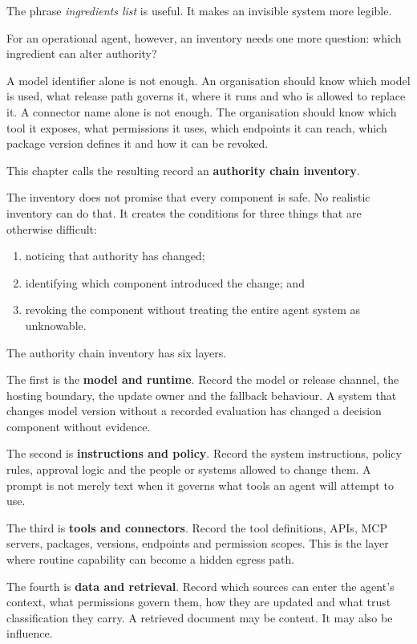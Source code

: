 The phrase \emph{ingredients list} is useful. It makes an invisible
system more legible.

For an operational agent, however, an inventory needs one more question:
which ingredient can alter authority?

A model identifier alone is not enough. An organisation should know
which model is used, what release path governs it, where it runs and who
is allowed to replace it. A connector name alone is not enough. The
organisation should know which tool it exposes, what permissions it
uses, which endpoints it can reach, which package version defines it and
how it can be revoked.

This chapter calls the resulting record an \textbf{authority chain
inventory}.

The inventory does not promise that every component is safe. No
realistic inventory can do that. It creates the conditions for three
things that are otherwise difficult:

\begin{enumerate}
\def\labelenumi{\arabic{enumi}.}
\tightlist
\item
  noticing that authority has changed;
\item
  identifying which component introduced the change; and
\item
  revoking the component without treating the entire agent system as
  unknowable.
\end{enumerate}

The authority chain inventory has six layers.

The first is the \textbf{model and runtime}. Record the model or release
channel, the hosting boundary, the update owner and the fallback
behaviour. A system that changes model version without a recorded
evaluation has changed a decision component without evidence.

The second is \textbf{instructions and policy}. Record the system
instructions, policy rules, approval logic and the people or systems
allowed to change them. A prompt is not merely text when it governs what
tools an agent will attempt to use.

The third is \textbf{tools and connectors}. Record the tool definitions,
APIs, MCP servers, packages, versions, endpoints and permission scopes.
This is the layer where routine capability can become a hidden egress
path.

The fourth is \textbf{data and retrieval}. Record which sources can
enter the agent's context, what permissions govern them, how they are
updated and what trust classification they carry. A retrieved document
may be content. It may also be influence.

